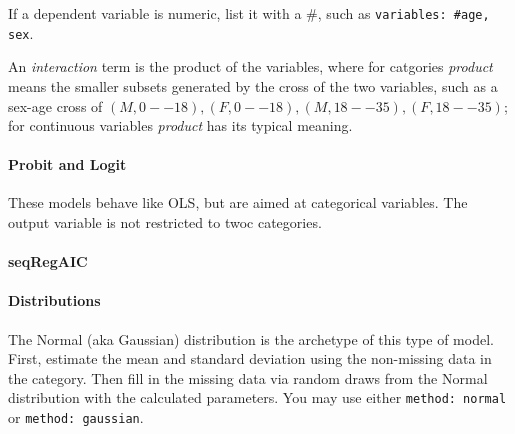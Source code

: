 \documentclass{article}
\begin{document}
If a dependent variable is numeric, list it with a \#, such as {\tt variables:
\#age, sex}.

An {\em interaction} term is the product of the variables, where for catgories {\em
product} means the smaller subsets generated by the cross of the two variables, such as
a sex-age cross of $(M, 0--18), (F, 0--18), (M, 18--35), (F, 18--35)$; for continuous
variables {\em product} has its typical meaning.




\paragraph{Probit and Logit} These models behave like OLS, but are aimed at categorical
variables. The output variable is not restricted to twoc categories.

\paragraph{seqRegAIC}


\paragraph{Distributions} The Normal (aka Gaussian) distribution is the archetype of this
type of model. First, estimate the mean and standard deviation using the non-missing data
in the category. Then fill in the missing data via random draws from the Normal
distribution with the calculated parameters. You may use either {\tt method: normal} or
{\tt method: gaussian}.
\end{document}
